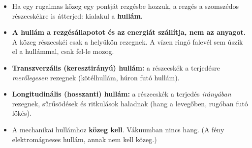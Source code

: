 \documentclass[12pt]{article}
\begin{document}
\begin{minipage}[t]{0.52\linewidth}\vspace{0pt}
\begin{itemize}
  \item Ha egy rugalmas közeg egy pontját rezgésbe hozzuk, a rezgés a szomszédos részecskékre
    is átterjed: kialakul a \textbf{hullám}.
  \item \textbf{A hullám a rezgésállapotot és az energiát szállítja, nem az anyagot.} A
    közeg részecskéi csak a helyükön rezegnek. A vízen ringó falevél sem úszik el a
    hullámmal, csak fel-le mozog.
  \item \textbf{Transzverzális (keresztirányú) hullám:} a részecskék a terjedésre
    \emph{merőlegesen} rezegnek (kötélhullám, húron futó hullám).
  \item \textbf{Longitudinális (hosszanti) hullám:} a részecskék a terjedés
    \emph{irányában} rezegnek, sűrűsödések és ritkulások haladnak (hang a levegőben,
    rugóban futó lökés).
  \item A mechanikai hullámhoz \textbf{közeg kell}. Vákuumban nincs hang.
    (A fény elektromágneses hullám, annak nem kell közeg.)
\end{itemize}
\end{minipage}\hfill
\begin{minipage}[t]{0.45\linewidth}\vspace{0pt}\centering
{}

\vspace{12pt}
\end{minipage}
\end{document}
